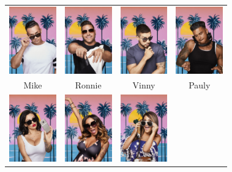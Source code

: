 \documentclass{beamer}\usepackage[]{graphicx}\usepackage[]{color}
\begin{document}
\begin{darkframes}
    \begin{frame}{}
      \begin{center}
        \begin{tabular}{cccc}
          \includegraphics[width=0.8in]{mike} & 
          \includegraphics[width=0.8in]{ronnie} &
          \includegraphics[width=0.8in]{vinny} &
          \includegraphics[width=0.8in]{pauly} \\
          Mike & Ronnie & Vinny & Pauly \\
          \includegraphics[width=0.8in]{jwoww} &
          \includegraphics[width=0.8in]{snooki} &
          \includegraphics[width=0.8in]{deena} &

\end{tabular}
\end{center}
\end{frame}
\end{darkframes}
\end{document}

